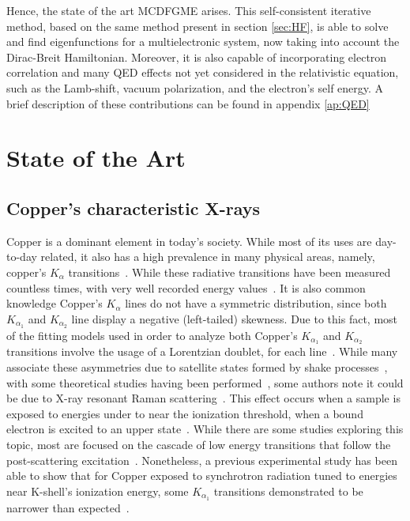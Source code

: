 Hence, the state of the art \gls{MCDFGME} arises. This self-consistent iterative method, based on the same method present in section \ref{sec:HF}, is able to solve and find eigenfunctions for a multielectronic system, now taking into account the Dirac-Breit Hamiltonian. Moreover, it is also capable of incorporating electron correlation and many QED effects not yet considered in the relativistic equation, such as the Lamb-shift, vacuum polarization, and the electron's self energy.
A brief description of these contributions can be found in  appendix \ref{ap:QED}




\section{State of the Art}


\subsection{Copper's characteristic X-rays}
Copper is a dominant element in today's society. While most of its uses are day-to-day related, it also has a high prevalence in many physical areas, namely, copper's $K_\alpha$ transitions~\cite{Nguyen2022}. While these radiative transitions have been measured countless times, with very well recorded energy values~\cite{Melia2020,Melia2019,Sorum1987,Bremer1982,Deutsch1995}.
It is also common knowledge Copper's $K_\alpha$ lines do not have a symmetric distribution, since both $K_{\alpha_1}$ and $K_{\alpha_2}$ line display a negative (left-tailed) skewness. Due to this fact, most of the fitting models used in order to analyze both Copper's $K_{\alpha_1}$ and $K_{\alpha_2}$ transitions involve the usage of a Lorentzian doublet, for each line~\cite{Ito2016,Berger1986}.
While many associate these asymmetries due to satellite states formed by shake processes~\cite{Galambosi2003,Nguyen2022}, with some theoretical studies having been performed~\cite{Chantler2009}, some authors note it could be due to X-ray resonant Raman scattering~\cite{Galambosi2003}. This effect occurs when a sample is exposed to energies under to near the ionization threshold, when a bound electron is excited to an upper state~\cite{RamanBook}.
While there are some studies exploring this topic, most are focused on the cascade of low energy transitions that follow the post-scattering excitation~\cite{Carra1995}. Nonetheless, a previous experimental study has been able to show that for Copper exposed to synchrotron radiation tuned to energies near K-shell's ionization energy, some $K_{\alpha_1}$ transitions demonstrated to be narrower than expected~\cite{Eisenberger1976}.








